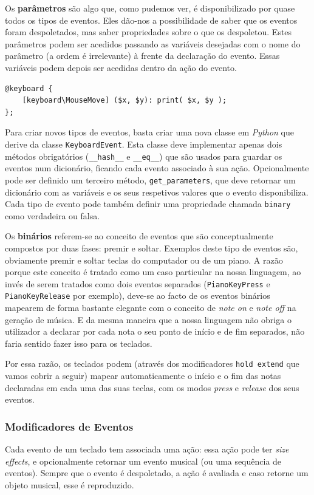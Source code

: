Os \textbf{parâmetros} são algo que, como pudemos ver, é disponibilizado por quase todos os tipos de eventos. Eles dão-nos a possibilidade de saber que os eventos foram despoletados, mas saber propriedades sobre o que os despoletou. Estes parâmetros podem ser acedidos passando as variáveis desejadas com o nome do parâmetro (a ordem é irrelevante) à frente da declaração do evento. Essas variáveis podem depois ser acedidas dentro da ação do evento.

\begin{lstlisting}[caption={Teclado que imprime as coordenadas do rato sempre que ele se move}]
@keyboard {
    [keyboard\MouseMove] ($x, $y): print( $x, $y );
};
\end{lstlisting}

Para criar novos tipos de eventos, basta criar uma nova classe em \textit{Python} que derive da classe \texttt{KeyboardEvent}. Esta classe deve implementar apenas dois métodos obrigatórios (\texttt{\_\_hash\_\_} e \texttt{\_\_eq\_\_}) que são usados para guardar os eventos num dicionário, ficando cada evento associado à sua ação. Opcionalmente pode ser definido um terceiro método, \texttt{get\_parameters}, que deve retornar um dicionário com as variáveis e os seus respetivos valores que o evento disponibiliza. Cada tipo de evento pode também definir uma propriedade chamada \texttt{binary} como verdadeira ou falsa.

Os \textbf{binários} referem-se ao conceito de eventos que são conceptualmente compostos por duas fases: premir e soltar. Exemplos deste tipo de eventos são, obviamente premir e soltar teclas do computador ou de um piano. A razão porque este conceito é tratado como um caso particular na nossa linguagem, ao invés de serem tratados como dois eventos separados (\texttt{PianoKeyPress} e \texttt{PianoKeyRelease} por exemplo), deve-se ao facto de os eventos binários mapearem de forma bastante elegante com o conceito de \textit{note on} e \textit{note off} na geração de música. E da mesma maneira que a nossa linguagem não obriga o utilizador a declarar por cada nota o seu ponto de início e de fim separados, não faria sentido fazer isso para os teclados.

Por essa razão, os teclados podem (através dos modificadores \texttt{hold extend} que vamos cobrir a seguir) mapear automaticamente o início e o fim das notas declaradas em cada uma das suas teclas, com os modos \textit{press} e \textit{release} dos seus eventos.

\subsubsection{Modificadores de Eventos}
Cada evento de um teclado tem associada uma ação: essa ação pode ter \textit{size effects}, e opcionalmente retornar um evento musical (ou uma sequência de eventos). Sempre que o evento é despoletado, a ação é avaliada e caso retorne um objeto musical, esse é reproduzido.

